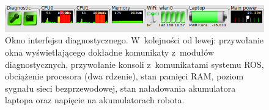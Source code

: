 \begin{figure}[htb!]
\centering
\includegraphics[width=13cm]{../../Common/img/ros/elektron_dashboard}
\caption[Okno interfejsu diagnostycznego]{Okno interfejsu diagnostycznego.
W~kolejności od lewej: przywołanie okna wyświetlającego dokładne komunikaty
z~modułów diagnostycznych, przywołanie
konsoli z~komunikatami systemu ROS, obciążenie procesora (dwa rdzenie), stan
pamięci RAM, poziom sygnału sieci bezprzewodowej, stan naładowania akumulatora
laptopa oraz napięcie na akumulatorach robota.}
\label{fig:elektron_dashboard}
\end{figure}
